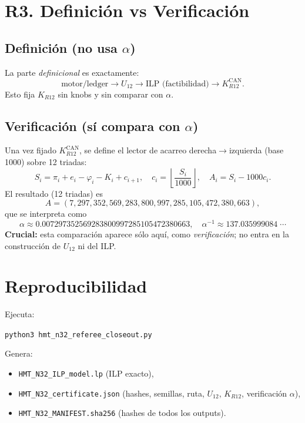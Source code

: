 \documentclass[11pt]{article}
\begin{document}
\section{R3. Definición vs Verificación}

\subsection{Definición (no usa $\alpha$)}
La parte \emph{definicional} es exactamente:
\[
\text{motor/ledger} \longrightarrow U_{12} \longrightarrow \text{ILP (factibilidad)} \longrightarrow K_{R12}^{\mathrm{CAN}}.
\]
Esto fija $K_{R12}$ sin knobs y sin comparar con $\alpha$.

\subsection{Verificación (sí compara con $\alpha$)}
Una vez fijado $K_{R12}^{\mathrm{CAN}}$, se define el lector de acarreo derecha$\to$izquierda (base 1000) sobre 12 triadas:
\[
S_i=\pi_i+e_i-\varphi_i-K_i + c_{i+1},\quad c_i=\left\lfloor\frac{S_i}{1000}\right\rfloor,\quad A_i=S_i-1000c_i.
\]
El resultado (12 triadas) es
\[
A=(7,297,352,569,283,800,997,285,105,472,380,663),
\]
que se interpreta como
\[
\alpha\approx 0.007297352569283800997285105472380663,
\quad \alpha^{-1}\approx 137.035999084\;\cdots
\]
\textbf{Crucial:} esta comparación aparece sólo aquí, como \emph{verificación}; no entra en la construcción de $U_{12}$ ni del ILP.

\section*{Reproducibilidad}
Ejecuta:
\begin{center}
\texttt{python3 hmt\_n32\_referee\_closeout.py}
\end{center}
Genera:
\begin{itemize}
  \item \texttt{HMT\_N32\_ILP\_model.lp} (ILP exacto),
  \item \texttt{HMT\_N32\_certificate.json} (hashes, semillas, ruta, $U_{12}$, $K_{R12}$, verificación $\alpha$),
  \item \texttt{HMT\_N32\_MANIFEST.sha256} (hashes de todos los outputs).
\end{itemize}
\end{document}

